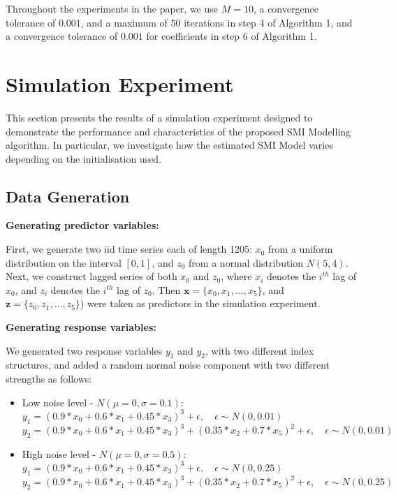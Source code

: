 \documentclass[
  11pt,
  a4paper,
]{article}
\begin{document}
Throughout the experiments in the paper, we use \(M = 10\), a
convergence tolerance of \(0.001\), and a maximum of \(50\) iterations
in step 4 of Algorithm 1, and a convergence tolerance of \(0.001\) for
coefficients in step 6 of Algorithm 1.

\section{Simulation Experiment}\label{sec-simulation}

This section presents the results of a simulation experiment designed to
demonstrate the performance and characteristics of the proposed SMI
Modelling algorithm. In particular, we investigate how the estimated SMI
Model varies depending on the initialisation used.

\subsection{Data Generation}\label{sec-datagen}

\textbf{Generating predictor variables:}

First, we generate two iid time series each of length 1205: \(x_{0}\)
from a uniform distribution on the interval \([0, 1]\), and \(z_{0}\)
from a normal distribution \(N(5, 4)\). Next, we construct lagged series
of both \(x_{0}\) and \(z_{0}\), where \(x_i\) denotes the \(i^{th}\)
lag of \(x_{0}\), and \(z_i\) denotes the \(i^{th}\) lag of \(z_{0}\).
Then \(\bm{x} = \{x_{0}, x_{1}, \dots, x_{5}\}\), and
\(\bm{z} = \{z_{0}, z_{1}, \dots, z_{5}\}\)) were taken as predictors in
the simulation experiment.

\textbf{Generating response variables:}

We generated two response variables \(y_{1}\) and \(y_{2}\), with two
different index structures, and added a random normal noise component
with two different strengths as follows:

\begin{itemize}
\item
  Low noise level - \(N(\mu = 0, \sigma = 0.1)\):\\
  \(y_{1} = (0.9*x_{0} + 0.6*x_{1} + 0.45*x_{3})^3 + \epsilon, \quad \epsilon\sim N(0, 0.01)\)\\
  \(y_{2} = (0.9*x_{0} + 0.6*x_{1} + 0.45*x_{3})^3 + (0.35*x_{2} + 0.7*x_{5})^2 + \epsilon, \quad \epsilon\sim N(0, 0.01)\)
\item
  High noise level - \(N(\mu = 0, \sigma = 0.5)\):\\
  \(y_{1} = (0.9*x_{0} + 0.6*x_{1} + 0.45*x_{3})^3 + \epsilon, \quad \epsilon\sim N(0, 0.25)\)\\
  \(y_{2} = (0.9*x_{0} + 0.6*x_{1} + 0.45*x_{3})^3 + (0.35*x_{2} + 0.7*x_{5})^2 + \epsilon, \quad \epsilon\sim N(0, 0.25)\)
\end{itemize}
\end{document}
